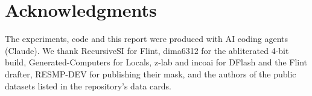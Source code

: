 \documentclass[11pt]{article}
\begin{document}
\section*{Acknowledgments}
The experiments, code and this report were produced with AI coding agents (Claude). We thank RecursiveSI for Flint,
dima6312 for the abliterated 4-bit build, Generated-Computers for Locals, z-lab and incoai for DFlash and the Flint
drafter, RESMP-DEV for publishing their mask, and the authors of the public datasets listed in the repository's data
cards.



\end{document}
